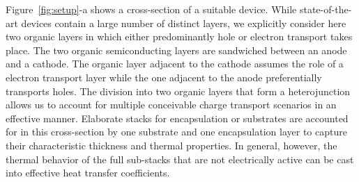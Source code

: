 \documentclass[%
9pt,
 aip,
rsi,%
 amsmath,amssymb,
preprint,%
]{revtex4-1}
\begin{document}
Figure~\ref{fig:setup}-a shows a cross-section of a suitable device. 
While state-of-the-art devices contain a large number of distinct layers, we explicitly consider here two organic layers in which either predominantly hole or electron transport takes place. 
The two organic semiconducting layers are sandwiched between an anode and a cathode.
The organic layer adjacent to the cathode assumes the role of a electron transport layer while the one adjacent to the anode preferentially transports holes.
The division into two organic layers that form a heterojunction allows us to account for multiple conceivable charge transport scenarios in an effective manner.
Elaborate stacks for encapsulation or substrates are accounted for in this cross-section by one substrate and one encapsulation layer to capture their characteristic thickness and thermal properties. In general, however, the thermal behavior of the full sub-stacks that are not electrically active can be cast into effective heat transfer coefficients.
 
\end{document}
